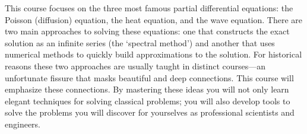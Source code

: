 \documentclass[10pt]{article}
\begin{document}
This course focuses on the three most famous partial differential equations:  
the Poisson (diffusion) equation, the heat equation, and the wave equation.
There are two main approaches to solving these equations: 
one that constructs the exact solution as an infinite series 
(the `spectral method') 
and another that uses numerical methods to quickly 
build approximations to the solution.
For historical reasons these two approaches are usually taught
in distinct courses---an unfortunate fissure that masks
beautiful and deep connections.
This course will emphasize these connections.  
By mastering these ideas you will not only learn elegant techniques
for solving classical problems; you will also develop tools 
to solve the problems you will discover for yourselves as 
professional scientists and engineers.
\end{document}

